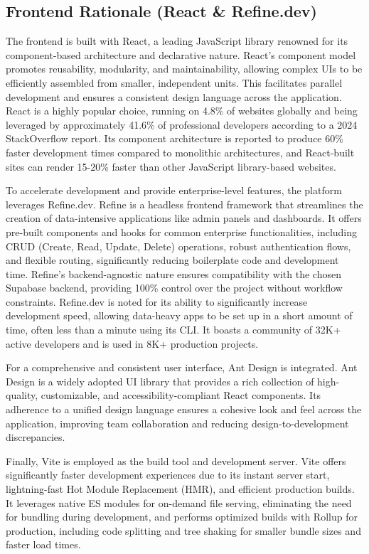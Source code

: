 \subsection{Frontend Rationale (React \& Refine.dev)}
The frontend is built with React, a leading JavaScript library renowned for its component-based architecture and declarative nature. React's component model promotes reusability, modularity, and maintainability, allowing complex UIs to be efficiently assembled from smaller, independent units. This facilitates parallel development and ensures a consistent design language across the application. React is a highly popular choice, running on 4.8\% of websites globally and being leveraged by approximately 41.6\% of professional developers according to a 2024 StackOverflow report. Its component architecture is reported to produce 60\% faster development times compared to monolithic architectures, and React-built sites can render 15-20\% faster than other JavaScript library-based websites. 

To accelerate development and provide enterprise-level features, the platform leverages Refine.dev. Refine is a headless frontend framework that streamlines the creation of data-intensive applications like admin panels and dashboards. It offers pre-built components and hooks for common enterprise functionalities, including CRUD (Create, Read, Update, Delete) operations, robust authentication flows, and flexible routing, significantly reducing boilerplate code and development time. Refine's backend-agnostic nature ensures compatibility with the chosen Supabase backend, providing 100\% control over the project without workflow constraints. Refine.dev is noted for its ability to significantly increase development speed, allowing data-heavy apps to be set up in a short amount of time, often less than a minute using its CLI. It boasts a community of 32K+ active developers and is used in 8K+ production projects. 

For a comprehensive and consistent user interface, Ant Design is integrated. Ant Design is a widely adopted UI library that provides a rich collection of high-quality, customizable, and accessibility-compliant React components. Its adherence to a unified design language ensures a cohesive look and feel across the application, improving team collaboration and reducing design-to-development discrepancies.

Finally, Vite is employed as the build tool and development server. Vite offers significantly faster development experiences due to its instant server start, lightning-fast Hot Module Replacement (HMR), and efficient production builds. It leverages native ES modules for on-demand file serving, eliminating the need for bundling during development, and performs optimized builds with Rollup for production, including code splitting and tree shaking for smaller bundle sizes and faster load times. 

